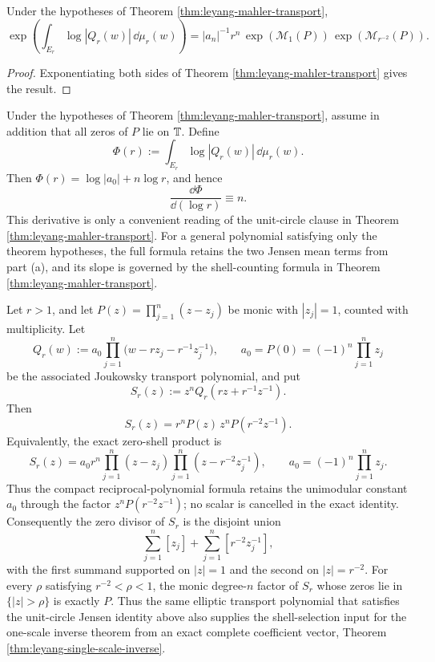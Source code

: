 \begin{remark}\label{rem:elliptic-two-scale-mahler-multiplicative}
Under the hypotheses of Theorem \ref{thm:leyang-mahler-transport},
\[
\exp\!\left(\int_{E_r}\log|Q_r(w)|\,\dd\mu_r(w)\right)
=
|a_n|^{-1}r^n\,\exp(\mathcal M_1(P))\,\exp(\mathcal M_{r^{-2}}(P)).
\]
\end{remark}
\begin{proof}
Exponentiating both sides of Theorem \ref{thm:leyang-mahler-transport} gives the result.
\end{proof}


\begin{remark}\label{rem:leyang-linear-log-response}
Under the hypotheses of Theorem \ref{thm:leyang-mahler-transport}, assume in addition that all zeros of \(P\) lie on \(\mathbb{T}\).  Define
\[
\Phi(r):=\int_{E_r}\log|Q_r(w)|\,\dd\mu_r(w).
\]
Then \(\Phi(r)=\log|a_0|+n\log r\), and hence
\[
\frac{\dd \Phi}{\dd(\log r)}\equiv n.
\]
This derivative is only a convenient reading of the unit-circle clause in Theorem \ref{thm:leyang-mahler-transport}.  For a general polynomial satisfying only the theorem hypotheses, the full formula retains the two Jensen mean terms from part \textup{(a)}, and its slope is governed by the shell-counting formula in Theorem \ref{thm:leyang-mahler-transport}.
\end{remark}


\begin{theorem}\label{thm:leyang-elliptic-shell-separation}
Let \(r>1\), and let \(P(z)=\prod_{j=1}^{n}(z-z_j)\) be monic with \(|z_j|=1\), counted with multiplicity.  Let
\[
Q_r(w):=a_0\prod_{j=1}^{n}\bigl(w-rz_j-r^{-1}z_j^{-1}\bigr),\qquad a_0=P(0)=(-1)^n\prod_{j=1}^{n}z_j
\]
be the associated Joukowsky transport polynomial, and put
\[
S_r(z):=z^nQ_r\!\left(rz+r^{-1}z^{-1}\right).
\]
Then
\[
\boxed{\;
S_r(z)=r^nP(z)\,z^nP\!\left(r^{-2}z^{-1}\right).
\;}
\]
Equivalently, the exact zero-shell product is
\[
S_r(z)
=a_0r^n\prod_{j=1}^{n}(z-z_j)
\prod_{j=1}^{n}(z-r^{-2}z_j^{-1}),
\qquad
a_0=(-1)^n\prod_{j=1}^{n}z_j .
\]
Thus the compact reciprocal-polynomial formula retains the unimodular
constant \(a_0\) through the factor \(z^nP(r^{-2}z^{-1})\); no scalar is
cancelled in the exact identity.
Consequently the zero divisor of \(S_r\) is the disjoint union
\[
\sum_{j=1}^{n}[z_j]+\sum_{j=1}^{n}[r^{-2}z_j^{-1}],
\]
with the first summand supported on \(|z|=1\) and the second on \(|z|=r^{-2}\).  For every \(\rho\) satisfying \(r^{-2}<\rho<1\), the monic degree-\(n\) factor of \(S_r\) whose zeros lie in \(\{|z|>\rho\}\) is exactly \(P\).  Thus the same elliptic transport polynomial that satisfies the unit-circle Jensen identity above also supplies the shell-selection input for the one-scale inverse theorem from an exact complete coefficient vector, Theorem \ref{thm:leyang-single-scale-inverse}.
\end{theorem}

